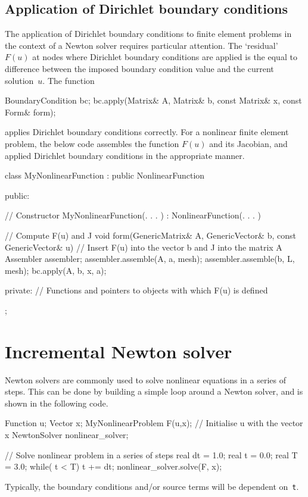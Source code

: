 \subsection{Application of Dirichlet boundary conditions}
%
The application of Dirichlet boundary conditions to finite element
problems in the context of a Newton solver requires particular 
attention. The `residual' $F(u)$ at nodes where Dirichlet boundary
conditions are applied is the equal to difference between the 
imposed boundary condition value and the current solution~$u$.
The function 
%
{\small
\begin{code}
BoundaryCondition bc;
bc.apply(Matrix& A, Matrix& b, const Matrix& x, const Form& form);
\end{code}
}
%
applies Dirichlet boundary conditions correctly. For a nonlinear
finite element problem, the below code assembles the function $F(u)$
and its Jacobian, and applied Dirichlet boundary conditions in the
appropriate manner.
%
\small
\begin{code}
class MyNonlinearFunction : public NonlinearFunction
{
public: 
  
  // Constructor 
  MyNonlinearFunction(. . . ) : NonlinearFunction(. . . ) {}
  
  // Compute F(u) and J 
  void form(GenericMatrix& A, GenericVector& b, 
            const GenericVector& u)
  {
    // Insert F(u) into the vector b and J into the matrix A 
    Assembler assembler;
    assembler.assemble(A, a, mesh);
    assembler.assemble(b, L, mesh);
    bc.apply(A, b, x, a);
  }

private:
  // Functions and pointers to objects with which F(u) is defined
};
\end{code}
\normalsize
\section{Incremental Newton solver}
%
Newton solvers are commonly used to solve nonlinear equations in a series 
of steps. This can be done by building a simple loop around a Newton solver,
and is shown in the following code.
%
{
\begin{code}
Function u;
Vector x;
MyNonlinearProblem F(u,x); // Initialise u with the vector x
NewtonSolver nonlinear_solver;

// Solve nonlinear problem in a series of steps
real dt = 1.0; real t  = 0.0; real T  = 3.0;
while( t < T)
{
  t += dt;
  nonlinear_solver.solve(F, x);
}
\end{code}
}
%
Typically, the boundary conditions and/or source terms will be dependent 
on~\texttt{t}.
